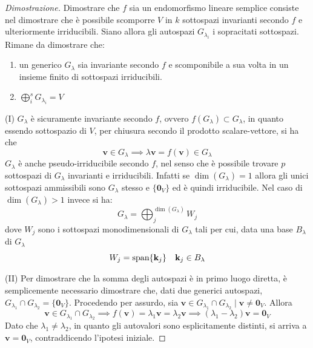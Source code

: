 \documentclass{article}
\begin{document}
    \begin{proof}[Dimostrazione]
        Dimostrare che $f$ sia un endomorfismo lineare semplice consiste nel dimostrare che è possibile scomporre $V$ in $k$ sottospazi invarianti secondo $f$ e ulteriormente irriducibili. Siano allora gli autospazi $G_{\lambda_i}$ i sopracitati sottospazi. 
        Rimane da dimostrare che:
        \begin{enumerate}[label=(\Roman*)]
            \item un generico $G_{\lambda}$ sia invariante secondo $f$ e scomponibile a sua volta in un insieme finito di sottospazi irriducibili.
            \item $\displaystyle \bigoplus_{i}^{s} G_{\lambda_i} = V$
        \end{enumerate}

        \vspace{10pt}
        (I) 
        $G_{\lambda}$ è sicuramente invariante secondo $f$, ovvero $f(G_{\lambda}) \subset G_{\lambda}$, in quanto essendo sottospazio di $V$, per chiusura secondo il prodotto scalare-vettore, si ha che
        \[
            \mathbf{v} \in G_{\lambda} \implies \lambda \mathbf{v} = f(\mathbf{v}) \in G_{\lambda} 
        \]
        $G_{\lambda}$ è anche pseudo-irriducibile secondo $f$, nel senso che è possibile trovare $p$ sottospazi di $G_{\lambda}$ invarianti e irriducibili. Infatti se $\dim(G_{\lambda}) = 1$ allora gli unici sottospazi ammissibili sono $G_{\lambda}$ stesso e $\{ \mathbf{0}_V \}$ ed è quindi irriducibile. 
        Nel caso di $\dim(G_{\lambda}) > 1$ invece si ha:
        \[
            G_{\lambda} = \bigoplus_{j}^{\dim(G_{\lambda})} W_j
        \] 
        dove $W_j$ sono i sottospazi monodimensionali di $G_{\lambda}$ tali per cui, data una base $B_{\lambda}$ di $G_{\lambda}$ 
        \[
            W_j = \textnormal{span}\{ \mathbf{k}_{j} \} \quad \mathbf{k}_{j} \in B_{\lambda}
        \] 

        \vspace{10pt}
        (II)
        Per dimostrare che la somma degli autospazi è in primo luogo diretta, è semplicemente necessario dimostrare che, dati due generici autospazi, $G_{\lambda_1} \cap G_{\lambda_2} = \{ \mathbf{0}_V \}$.
        Procedendo per assurdo, sia $\mathbf{v} \in G_{\lambda_1} \cap G_{\lambda_2} \; | \; \mathbf{v} \neq \mathbf{0}_V$. Allora 
        \[
           \mathbf{v} \in G_{\lambda_1} \cap G_{\lambda_2} \implies f(\mathbf{v}) = \lambda_1 \mathbf{v} = \lambda_2 \mathbf{v} \implies (\lambda_1 - \lambda_2) \mathbf{v} = \mathbf{0}_V
        \]
        Dato che $\lambda_1 \neq \lambda_2$, in quanto gli autovalori sono esplicitamente distinti, si arriva a $\mathbf{v} = \mathbf{0}_V$, contraddicendo l'ipotesi iniziale.
        

\end{proof}
\end{document}
